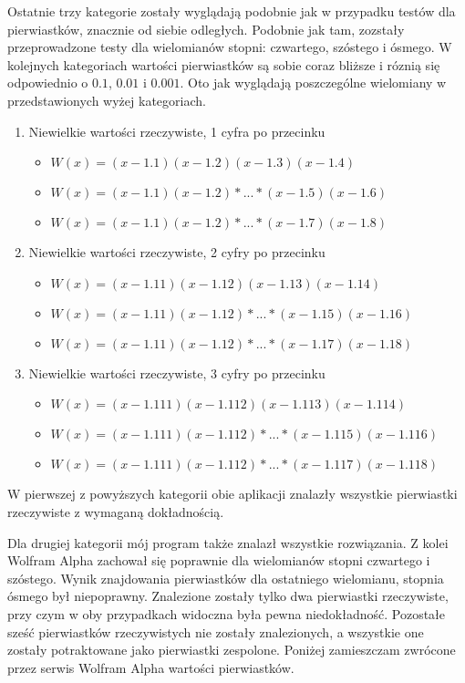 \documentclass[oneside,a4paper]{book}
\begin{document}
	Ostatnie trzy kategorie zostały wyglądają podobnie jak w przypadku testów dla pierwiastków, znacznie od siebie odległych. Podobnie jak tam, zozstały przeprowadzone testy dla wielomianów stopni: czwartego, szóstego i ósmego. W kolejnych kategoriach wartości pierwiastków są sobie coraz bliższe i róznią się odpowiednio o $0.1$, $0.01$ i $0.001$. Oto jak wyglądają poszczególne wielomiany w przedstawionych wyżej kategoriach.
	
	\begin{enumerate}
		\item Niewielkie wartości rzeczywiste, 1 cyfra po przecinku
		\begin{itemize}
			\item $W(x)=(x-1.1)(x-1.2)(x-1.3)(x-1.4)$
			\item $W(x)=(x-1.1)(x-1.2)*...*(x-1.5)(x-1.6)$
			\item $W(x)=(x-1.1)(x-1.2)*...*(x-1.7)(x-1.8)$
		\end{itemize}
		\item Niewielkie wartości rzeczywiste, 2 cyfry po przecinku
		\begin{itemize}
			\item $W(x)=(x-1.11)(x-1.12)(x-1.13)(x-1.14)$
			\item $W(x)=(x-1.11)(x-1.12)*...*(x-1.15)(x-1.16)$
			\item $W(x)=(x-1.11)(x-1.12)*...*(x-1.17)(x-1.18)$
		\end{itemize}
		\item Niewielkie wartości rzeczywiste, 3 cyfry po przecinku
		\begin{itemize}
			\item $W(x)=(x-1.111)(x-1.112)(x-1.113)(x-1.114)$
			\item $W(x)=(x-1.111)(x-1.112)*...*(x-1.115)(x-1.116)$
			\item $W(x)=(x-1.111)(x-1.112)*...*(x-1.117)(x-1.118)$
		\end{itemize}
	\end{enumerate}
	
	W pierwszej z powyższych kategorii obie aplikacji znalazły wszystkie pierwiastki rzeczywiste z wymaganą dokładnością.
	
	Dla drugiej kategorii mój program także znalazł wszystkie rozwiązania. Z kolei Wolfram Alpha zachował się poprawnie dla wielomianów stopni czwartego i szóstego. Wynik znajdowania pierwiastków dla ostatniego wielomianu, stopnia ósmego był niepoprawny. Znalezione zostały tylko dwa pierwiastki rzeczywiste, przy czym w oby przypadkach widoczna była pewna niedokładność. Pozostałe sześć pierwiastków rzeczywistych nie zostały znalezionych, a wszystkie one zostały potraktowane jako pierwiastki zespolone. Poniżej zamieszczam zwrócone przez serwis Wolfram Alpha wartości pierwiastków.
	
\end{document}
